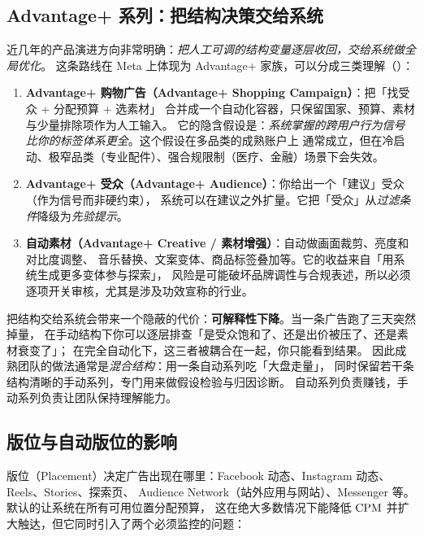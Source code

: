 \subsection{Advantage+ 系列：把结构决策交给系统}

近几年的产品演进方向非常明确：\emph{把人工可调的结构变量逐层收回，交给系统做全局优化}。
这条路线在 Meta 上体现为 Advantage+ 家族，可以分成三类理解（\cite{meta_advantage}）：

\begin{enumerate}
  \item \textbf{Advantage+ 购物广告（Advantage+ Shopping Campaign）}：把「找受众 + 分配预算 + 选素材」
        合并成一个自动化容器，只保留国家、预算、素材与少量排除项作为人工输入。
        它的隐含假设是：\emph{系统掌握的跨用户行为信号比你的标签体系更全}。这个假设在多品类的成熟账户上
        通常成立，但在冷启动、极窄品类（专业配件）、强合规限制（医疗、金融）场景下会失效。
  \item \textbf{Advantage+ 受众（Advantage+ Audience）}：你给出一个「建议」受众（作为信号而非硬约束），
        系统可以在建议之外扩量。它把「受众」从\emph{过滤条件}降级为\emph{先验提示}。
  \item \textbf{自动素材（Advantage+ Creative / 素材增强）}：自动做画面裁剪、亮度和对比度调整、
        音乐替换、文案变体、商品标签叠加等。它的收益来自「用系统生成更多变体参与探索」，
        风险是可能破坏品牌调性与合规表述，所以必须逐项开关审核，尤其是涉及功效宣称的行业。
\end{enumerate}

\begin{insight}[自动化的收益与代价必须分开算]
把结构交给系统会带来一个隐蔽的代价：\textbf{可解释性下降}。当一条广告跑了三天突然掉量，
在手动结构下你可以逐层排查「是受众饱和了、还是出价被压了、还是素材衰变了」；
在完全自动化下，这三者被耦合在一起，你只能看到结果。
因此成熟团队的做法通常是\emph{混合结构}：用一条自动系列吃「大盘走量」，
同时保留若干条结构清晰的手动系列，专门用来做假设检验与归因诊断。
自动系列负责赚钱，手动系列负责让团队保持理解能力。
\end{insight}

\subsection{版位与自动版位的影响}

版位（Placement）决定广告出现在哪里：Facebook 动态、Instagram 动态、Reels、Stories、探索页、
Audience Network（站外应用与网站）、Messenger 等。默认的让系统在所有可用位置分配预算，
这在绝大多数情况下能降低 $\operatorname{CPM}$ 并扩大触达，但它同时引入了两个必须监控的问题：

